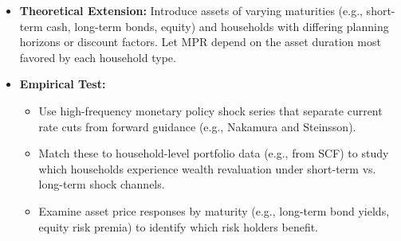 \documentclass[10pt]{article}
\begin{document}
\begin{itemize}
\begin{itemize}
\item \textbf{Theoretical Extension:}
Introduce assets of varying maturities (e.g., short-term cash, long-term bonds, equity) and households with differing planning horizons or discount factors. Let MPR depend on the asset duration most favored by each household type.
\item \textbf{Empirical Test:}
\begin{itemize}
    \item Use high-frequency monetary policy shock series that separate current rate cuts from forward guidance (e.g., Nakamura and Steinsson).
    \item Match these to household-level portfolio data (e.g., from SCF) to study which households experience wealth revaluation under short-term vs. long-term shock channels.
    \item Examine asset price responses by maturity (e.g., long-term bond yields, equity risk premia) to identify which risk holders benefit.
\end{itemize}
\end{itemize}
\end{itemize}
\end{document}
